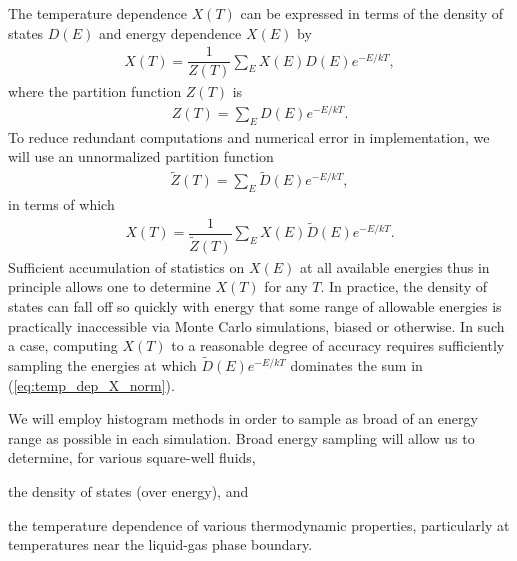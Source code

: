 \documentclass[11pt]{article}
\newcommand{\f}[2]{\dfrac{#1}{#2}} %
\newcommand{\p}[1]{\left(#1\right)} %
\newcommand{\red}[1]{{\bf \color{red} #1}}
\newcommand{\fixme}[1]{[\red{fixme:} \emph{#1}]}
\begin{document}
The temperature dependence $X\p{T}$ can be expressed in terms of the
density of states $D\p{E}$ and energy dependence $X\p{E}$ by
\begin{align}
  X\p{T}=\f1{Z\p{T}}\sum_EX\p{E}D\p{E}e^{-E/kT},
  \label{eq:temp_dep_X_norm}
\end{align}
where the partition function $Z\p{T}$ is
\begin{align}
  Z\p{T}=\sum_ED\p{E}e^{-E/kT}.
\end{align}
To reduce redundant computations and numerical error in
implementation, we will use an unnormalized partition function
\begin{align}
  \tilde Z\p{T}=\sum_E\tilde D\p{E}e^{-E/kT},
\end{align}
in terms of which
\begin{align}
  X\p{T}=\f1{\tilde Z\p{T}}\sum_EX\p{E}\tilde D\p{E}e^{-E/kT}.
  \label{eq:temp_dep_X}
\end{align}
Sufficient accumulation of statistics on $X\p{E}$ at all available
energies thus in principle allows one to determine $X\p{T}$ for any
$T$. In practice, the density of states can fall off so quickly with
energy that some range of allowable energies is practically
inaccessible via Monte Carlo simulations, biased or otherwise. In such
a case, computing $X\p{T}$ to a reasonable degree of accuracy requires
sufficiently sampling the energies at which $\tilde D\p{E}e^{-E/kT}$
dominates the sum in (\ref{eq:temp_dep_X_norm}).

We will employ histogram methods in order to sample as broad of an
energy range as possible in each simulation. Broad energy sampling
will allow us to determine, for various square-well fluids,
\begin{enumerate*}[label=\roman*)]
\item the density of states (over energy), and
\item the temperature dependence of various thermodynamic properties,
  particularly at temperatures near the liquid-gas phase boundary.
\end{enumerate*}


\end{document}
